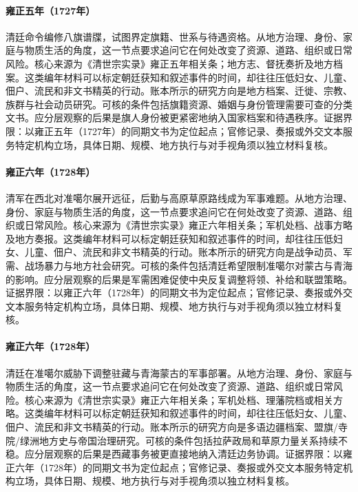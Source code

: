 \hypertarget{social:EQ-1727-BANNER-GENEALOGIES}{}\paragraph{雍正五年（1727年）}清廷命令编修八旗谱牒，试图界定旗籍、世系与待遇资格。从地方治理、身份、家庭与物质生活的角度，这一节点要求追问它在何处改变了资源、道路、组织或日常风险。核心来源为《清世宗实录》雍正五年相关条；地方志、督抚奏折及地方档案。这类编年材料可以标定朝廷获知和叙述事件的时间，却往往压低妇女、儿童、佃户、流民和非文书精英的行动。账本所示的研究方向是地方档案、迁徙、宗教、族群与社会动员研究。可核的条件包括旗籍资源、婚姻与身份管理需要可查的分类文书。应分层观察的后果是旗人身份被更紧密地纳入国家档案和待遇秩序。证据界限：以雍正五年（1727年）的同期文书为定位起点；官修记录、奏报或外交文本服务特定机构立场，具体日期、规模、地方执行与对手视角须以独立材料复核。
\hypertarget{social:EQ-1728-Dzungar-EXPEDITION}{}\paragraph{雍正六年（1728年）}清军在西北对准噶尔展开远征，后勤与高原草原路线成为军事难题。从地方治理、身份、家庭与物质生活的角度，这一节点要求追问它在何处改变了资源、道路、组织或日常风险。核心来源为《清世宗实录》雍正六年相关条；军机处档、战事方略及地方奏报。这类编年材料可以标定朝廷获知和叙述事件的时间，却往往压低妇女、儿童、佃户、流民和非文书精英的行动。账本所示的研究方向是战争动员、军需、战场暴力与地方社会研究。可核的条件包括清廷希望限制准噶尔对蒙古与青海的影响。应分层观察的后果是军需困难促使中央反复调整将领、补给和联盟策略。证据界限：以雍正六年（1728年）的同期文书为定位起点；官修记录、奏报或外交文本服务特定机构立场，具体日期、规模、地方执行与对手视角须以独立材料复核。
\hypertarget{social:EQ-1728-ZHUNGHAR-TIBET-SETTLEMENT}{}\paragraph{雍正六年（1728年）}清廷在准噶尔威胁下调整驻藏与青海蒙古的军事部署。从地方治理、身份、家庭与物质生活的角度，这一节点要求追问它在何处改变了资源、道路、组织或日常风险。核心来源为《清世宗实录》雍正六年相关条；军机处档、理藩院档或相关方略。这类编年材料可以标定朝廷获知和叙述事件的时间，却往往压低妇女、儿童、佃户、流民和非文书精英的行动。账本所示的研究方向是多语边疆档案、盟旗/寺院/绿洲地方史与帝国治理研究。可核的条件包括拉萨政局和草原力量关系持续不稳。应分层观察的后果是西藏事务被更直接地纳入清廷边务协调。证据界限：以雍正六年（1728年）的同期文书为定位起点；官修记录、奏报或外交文本服务特定机构立场，具体日期、规模、地方执行与对手视角须以独立材料复核。
